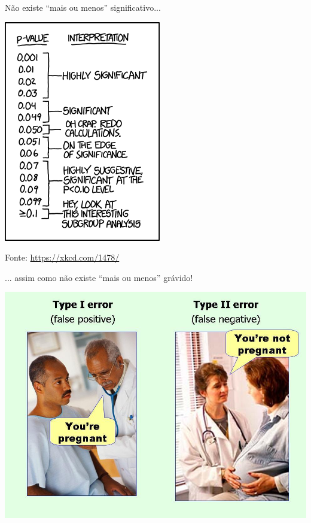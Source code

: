 \documentclass{beamer}
\begin{document}
\begin{frame}{\scriptsize Não existe ``mais ou menos'' significativo...}
  \begin{center}
    \includegraphics[height=.9\textheight]{Cap10-11/xkcd-p_values}

    \scriptsize
    \vfill
    \hfill Fonte: \url{https://xkcd.com/1478/}
  \end{center}
\end{frame}

\begin{frame}[label=analogia-erros]{\scriptsize ... assim como não existe ``mais ou menos'' grávido!}
  \begin{center}
    \includegraphics[height=.9\textheight]{Cap10-11/Type-I-and-II-errors}
  \end{center}
\end{frame}
\end{document}

